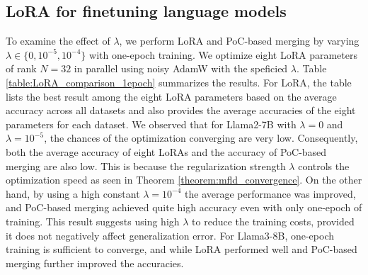 \clearpage


\subsection{LoRA for finetuning language models}\label{subsec:experiments_extra_lora}
To examine the effect of $\lambda$, we perform LoRA and PoC-based merging by varying $\lambda \in \{0,10^{-5},10^{-4}\}$ with one-epoch training. We optimize eight LoRA parameters of rank $N=32$ in parallel using noisy AdamW with the speficied $\lambda$. Table \ref{table:LoRA_comparison_1epoch} summarizes the results. For LoRA, the table lists the best result among the eight LoRA parameters based on the average accuracy across all datasets and also provides the average accuracies of the eight parameters for each dataset. We observed that for Llama2-7B with $\lambda=0$ and  $\lambda=10^{-5}$, the chances of the optimization converging are very low. Consequently, both the average accuracy of eight LoRAs and the accuracy of PoC-based merging are also low. This is because the regularization strength $\lambda$ controls the optimization speed as seen in Theorem \ref{theorem:mfld_convergence}. On the other hand, by using a high constant $\lambda=10^{-4}$ the average performance was improved, and PoC-based merging achieved quite high accuracy even with only one-epoch of training. This result suggests using high $\lambda$ to reduce the training costs, provided it does not negatively affect generalization error. For Llama3-8B, one-epoch training is sufficient to converge, and while LoRA performed well and PoC-based merging further improved the accuracies.

